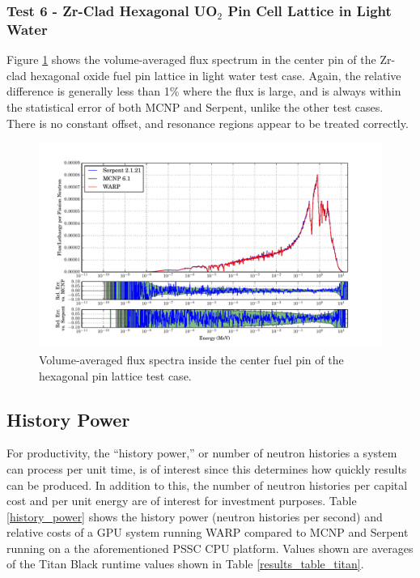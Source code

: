 \documentclass[preprint,12pt]{elsarticle}
\begin{document}
\newpage
\subsubsection{Test 6 - Zr-Clad Hexagonal UO$_2$ Pin Cell Lattice in Light Water}

Figure \ref{assembly-lw_spec} shows the volume-averaged flux spectrum in the center pin of the Zr-clad hexagonal oxide fuel pin lattice in light water test case.  Again, the relative difference is generally less than 1\% where the flux is large, and is always within the statistical error of both MCNP and Serpent, unlike the other test cases.  There is no constant offset, and resonance regions appear to be treated correctly.  

\begin{figure}[h!]
\centering
\includegraphics[width=\textwidth,trim= 1cm 0cm 1cm 0cm]{graphics/assembly-lw_spec.pdf}
\caption{Volume-averaged flux spectra inside the center fuel pin of the hexagonal pin lattice test case. \label{assembly-lw_spec} }
\end{figure}

\newpage
\subsection{History Power}

For productivity, the ``history power,'' or  number of neutron histories a system can process per unit time, is of interest since this determines how quickly results can be produced.  In addition to this, the number of neutron histories per capital cost and per unit energy are of interest for investment purposes.  Table \ref{history_power} shows the history power (neutron histories per second) and relative costs of a GPU system running WARP compared to MCNP and Serpent running on a the aforementioned PSSC CPU platform.  Values shown are averages of the Titan Black runtime values shown in Table \ref{results_table_titan}.
\end{document}
